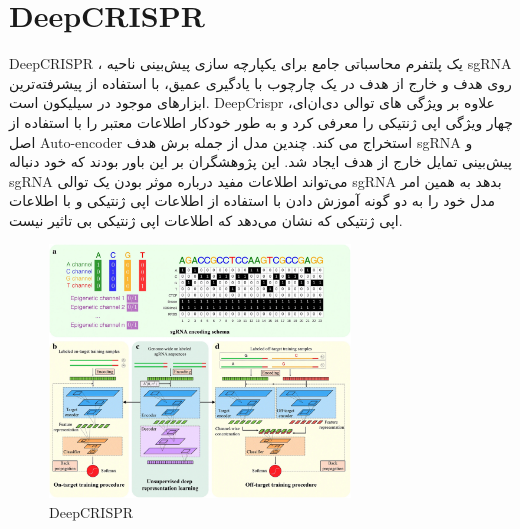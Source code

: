 \documentclass[12pt,a4paper,BCOR=.7cm,headsepline,bibliography=totoc]{report}
\begin{document}
\section{DeepCRISPR}
DeepCRISPR ، 
یک پلتفرم محاسباتی جامع برای یکپارچه سازی پیش‌بینی ناحیه‌ sgRNA روی هدف و خارج از هدف در یک چارچوب با یادگیری عمیق، با استفاده از پیشرفته‌ترین ابزارهای موجود در سیلیکون است. DeepCrispr \cite{DeepCRISPR} علاوه بر ویژگی های توالی دی‌ان‌ای، چهار ویژگی اپی ژنتیکی را معرفی کرد و به طور خودکار اطلاعات معتبر را با استفاده از اصل Auto-encoder استخراج می کند. چندین مدل از جمله برش هدف sgRNA و پیش‌بینی تمایل خارج از هدف ایجاد شد. این پژوهشگران بر این باور بودند که خود دنباله sgRNA می‌تواند اطلاعات مفید درباره موثر بودن یک توالی sgRNA بدهد به همین امر مدل خود را به دو گونه آموزش دادن با استفاده از اطلاعات اپی ژنتیکی و با اطلاعات اپی ژنتیکی که نشان می‌دهد که اطلاعات اپی ژنتیکی بی تاثیر نیست. 
\begin{figure}[H]
\centering
\includegraphics[width=8cm, ]{pictures/DeepCRISPR.jpg}
\caption{
DeepCRISPR~\cite{DeepCRISPR}
}\label{wrap-fig:4}
\end{figure}
\end{document}
